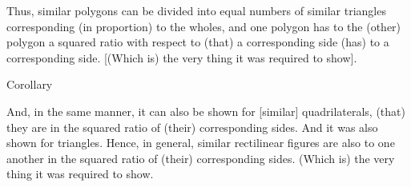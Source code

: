 \begin{Parallel}{}{}
{Thus, similar polygons can be divided into equal
numbers of similar
triangles corresponding (in proportion) to the wholes, and one
polygon has to the (other) polygon a squared ratio with respect to
(that) a corresponding side (has) to a corresponding side. [(Which is) the
very thing it was required to show].\\

\begin{center}
{\large Corollary}
\end{center}\vspace*{-7pt}

And, in the same manner, it can also be shown for [similar] quadrilaterals,
(that) they are in the squared ratio of (their) corresponding sides. And it was also
shown for triangles. Hence, in general, similar rectilinear figures are also to one
another in the squared ratio of (their) corresponding sides. (Which is) the
very thing it was required to show.\\}
\end{Parallel}

